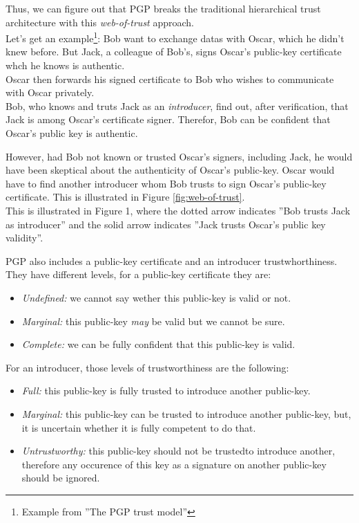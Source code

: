 \documentclass[journal, a4paper]{IEEEtran}
\begin{document}
Thus, we can figure out that PGP breaks the traditional hierarchical trust architecture with this \textit{web-of-trust} approach.\\

Let's get an example\footnote{Example from ''The PGP trust model''\cite{caronni2000}}: Bob want to exchange datas with Oscar, which he didn't knew before. But Jack, a colleague of Bob's, signs Oscar's public-key certificate whch he knows is authentic.\\
Oscar then forwards his signed certificate to Bob who wishes to communicate with Oscar privately.\\
Bob, who knows and truts Jack as an \textit{introducer}, find out, after verification, that Jack is among Oscar's certificate signer. Therefor, Bob can be confident that Oscar's public key is authentic.

However, had Bob not known or trusted Oscar's signers, including Jack, he would have been skeptical about the authenticity of Oscar's public-key. Oscar would have to find another introducer whom Bob trusts to sign Oscar's public-key certificate. This is illustrated in Figure \ref{fig:web-of-trust}.\\
This is illustrated in Figure 1, where the dotted arrow indicates ''Bob trusts Jack as introducer'' and the solid arrow indicates ''Jack trusts Oscar’s public key validity''. 


PGP also includes a public-key certificate and an introducer trustwhorthiness. They have different levels, for a public-key certificate they are:
\begin{itemize}
	\item \textit{Undefined:} we cannot say wether this public-key is valid or not.
	\item \textit{Marginal:} this public-key \textit{may} be valid but we cannot be sure.
	\item \textit{Complete:} we can be fully confident that this public-key is valid.
\end{itemize}
For an introducer, those levels of trustworthiness are the following:
\begin{itemize}
	\item \textit{Full:} this public-key is fully trusted to introduce another public-key.
	\item \textit{Marginal:} this public-key can be trusted to introduce another public-key, but, it is uncertain whether it is fully competent to do that.
	\item \textit{Untrustworthy:} this public-key should not be trustedto introduce another, therefore any occurence of this key as a signature on another public-key should be ignored.
\end{itemize}
\end{document}

